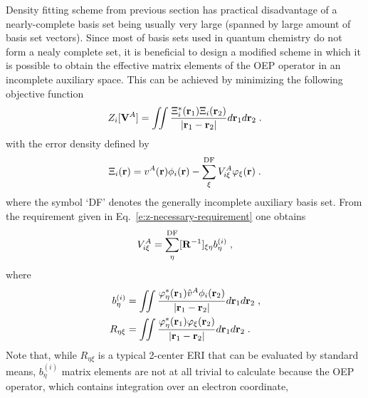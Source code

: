 \documentclass[aip,jcp,amsmath,amssymb,reprint,floatfix]{revtex4-1}
\begin{document}
Density fitting scheme from previous section has practical disadvantage of a nearly\hyp{}complete basis set
being usually very large (spanned by large amount of basis set vectors). 
Since most of basis sets used in quantum chemistry do not form a nealy complete
set, it is beneficial to design a modified scheme in which it is possible to obtain the effective 
matrix elements of the OEP operator in an incomplete auxiliary space. This can be achieved by minimizing 
the following objective function
%
\begin{equation} \label{e:z-incompl}
	Z_i[{\bf V}^A] = \iint 
        \frac{ \Xi_i^*({\bf r}_1) \Xi_i({\bf r}_2) }{\vert {\bf r}_1 - {\bf r}_2 \vert}  
         d{\bf r}_1 d{\bf r}_2  \;.
\end{equation}
%
with the error density defined by
%
\begin{equation} \label{e:error-incompl}
 \Xi_i({\bf r}) = v^A({\bf r}) \phi_i({\bf r}) - \sum_\xi^{\rm DF} V^A_{i\xi} \varphi_\xi({\bf r}) \;.
\end{equation}
%
where the symbol `DF' denotes the generally incomplete auxiliary basis set.
From the requirement given in Eq.~\eqref{e:z-necessary-requirement}
one obtains
%
\begin{equation} \label{e:v-incompl}
  V^A_{i\xi} = \sum_\eta^{\rm DF} [{\bf R}^{-1}]_{\xi\eta} b^{(i)}_\eta \;,
\end{equation}
%
where 
%
\begin{subequations}
\begin{align}
 b^{(i)}_\eta &= \iint 
                       \frac{ \varphi^*_\eta({\bf r}_1) \hat{v}^A \phi_i({\bf r}_2) } 
                            {\vert {\bf r}_1 - {\bf r}_2\vert}  
                 d{\bf r}_1 d{\bf r}_2 \;, \\
 R_{\eta\xi}  &= \iint 
                       \frac{ \varphi^*_\eta({\bf r}_1) \varphi_\xi({\bf r}_2) } 
                            {\vert {\bf r}_1 - {\bf r}_2\vert}  
                 d{\bf r}_1 d{\bf r}_2 \;.
\end{align}
\end{subequations}
%
Note that, while $R_{\eta\xi}$ is a typical 2\hyp{}center ERI 
that can be evaluated by standard means,\cite{McMurchie.Davidson.JComputPhys.1978}
$b^{(i)}_\eta$ matrix elements are not at all trivial to calculate
because the OEP operator, which contains integration over an electron coordinate,
\end{document}
